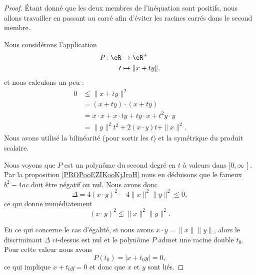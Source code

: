 \begin{proof}
	Étant donné que les deux membres de l'inéquation sont positifs, nous allons travailler en passant au carré afin d'éviter les racines carrés dans le second membre.

	Nous considérons l'application
	\begin{equation}
		\begin{aligned}
			P\colon \eR & \to \eR^+           \\
			t           & \mapsto \| x+ty \|,
		\end{aligned}
	\end{equation}
	et nous calculons un peu :
	\begin{subequations}
		\begin{align}
			0 & \leq \| x+ty \|^2                         \\
			  & =(x+ty)\cdot(x+ty)                        \\
			  & =x\cdot x+x\cdot ty+ty\cdot x+t^2y\cdot y \\
			  & =\| y \|^2t^2+2(x\cdot y)t+\| x \|^2.
		\end{align}
	\end{subequations}
	Nous avons utilisé la bilinéarité (pour sortir les \( t\)) et la symétrique du produit scalaire.

	Nous voyons que \( P\) est un polynôme du second degré en \( t\) à valeurs dans \( \mathopen[ 0 , \infty \mathclose[\). Par la proposition \ref{PROPooEZIKooKjJroH} nous en déduisons que le fameux \( b^2-4ac\) doit être négatif ou nul. Nous avons donc
	\begin{equation}
		\Delta=4(x\cdot y)^2-4\| x \|^2\| y \|^2\leq 0,
	\end{equation}
	ce qui donne immédiatement
	\begin{equation}
		(x\cdot y)^2\leq\| x \|^2\| y \|^2.
	\end{equation}

	En ce qui concerne le cas d'égalité, si nous avons \( x\cdot y=\| x \|\| y \|\), alors le discriminant \( \Delta\) ci-dessus est nul et le polynôme \( P\) admet une racine double \( t_0\). Pour cette valeur nous avons
	\begin{equation}
		P(t_0)=| x+t_0y |=0,
	\end{equation}
	ce qui implique \( x+t_0y=0\) et donc que \( x\) et \( y\) sont liés.


\end{proof}
